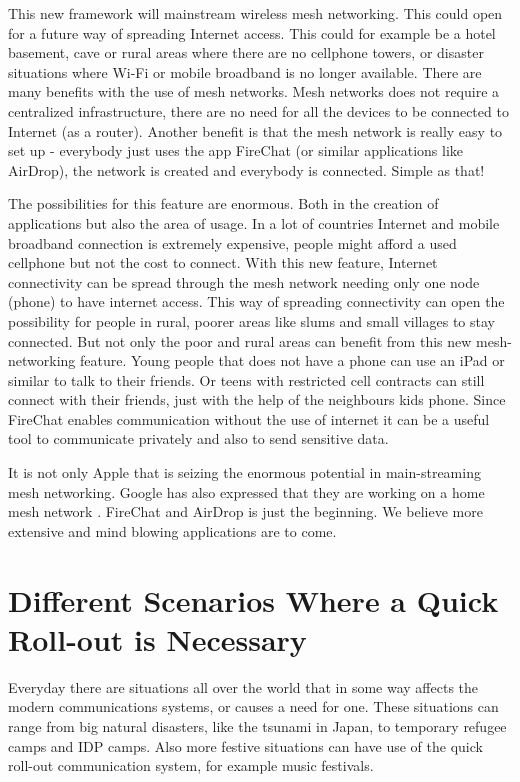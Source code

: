 This new framework will mainstream wireless mesh networking. This could open for a future way of spreading Internet access. This could for example be a hotel basement, cave or rural areas where there are no cellphone towers, or disaster situations where Wi-Fi or mobile broadband  is no longer available. There are many benefits with the use of mesh networks. Mesh networks does not require a centralized infrastructure, there are no need for all the devices to be connected to Internet (as a router). Another benefit is that the mesh network is really easy to set up - everybody just uses the app FireChat (or similar applications like AirDrop), the network is created and everybody is connected. Simple as that! 

The possibilities for this feature are enormous. Both in the creation of applications but also the area of usage. In a lot of countries Internet and mobile broadband connection is extremely expensive, people might afford a used cellphone but not the cost to connect. With this new feature, Internet connectivity can be spread through the mesh network needing only one node (phone) to have internet access. This way of spreading connectivity can open the possibility for people in rural, poorer areas like slums and small villages to stay connected. But not only the poor and rural areas can benefit from this new mesh-networking feature. Young people that does not have a phone can use an iPad or similar to talk to their friends. Or teens with restricted cell contracts can still connect with their friends, just with the help of the neighbours kids phone. Since FireChat enables communication without the use of internet it can be a useful tool to communicate privately and also to send sensitive data.
 
It is not only Apple that is seizing the enormous potential in main-streaming mesh networking. Google has also expressed that they are working on a home mesh network \cite{googleMesh}. FireChat and AirDrop is just the beginning. We believe more extensive and mind blowing applications are to come. 
 
\section{Different Scenarios Where a Quick Roll-out is Necessary}
Everyday there are situations all over the world that in some way affects the modern communications systems, or causes a need for one.  These situations can range from big natural disasters, like the tsunami in Japan, to temporary refugee camps and IDP camps. Also more festive situations can have use of the quick roll-out communication system, for example music festivals. 

